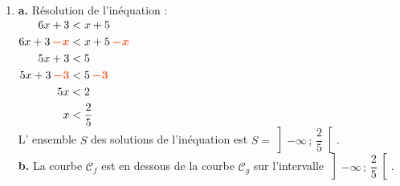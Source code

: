 \documentclass[a4paper,11pt]{article}
\begin{document}
{\begin{seanceD}{}
\begin{enumerate}
\begin{enumerate}
\begin{tikzpicture}
\end{tikzpicture}
\item On cherche les réels qui sont à la fois dans $]-\infty;22]$ et dans $]31;40]$.On regarde la partie de l'intervalle qui est coloriée à la fois en bleu et en rouge. On observe que les deux intervalles sont disjoints donc aucun réel n'appartient aux deux ensembles.\\$I={\color[HTML]{f15929}\boldsymbol{\emptyset}}$.\\
\end{enumerate}

\item  \textbf {a.}  Résolution de l'inéquation :\\
              $\begin{aligned}
              6x+3&<x+5\\
              6x+3\,{\color[HTML]{f15929}\boldsymbol{-x}}&<x+5\,{\color[HTML]{f15929}\boldsymbol{-x}}\\
              5x+3&<5\\
              5x+3\,{\color[HTML]{f15929}\boldsymbol{-3}}&<5\,{\color[HTML]{f15929}\boldsymbol{-3}}\\
              5x&<2\\
            x&<\dfrac{2}{5}
              \end{aligned}$
              \\
              L'  ensemble $S$ des solutions de l'inéquation est
              $S= \left]-\infty\,;\,\dfrac{2}{5}\right[$.\\\textbf {b.}  
              La courbe $\mathscr{C}_f$ est en dessous de la courbe $\mathscr{C}_g$ sur l'intervalle $\left]-\infty\,;\,\dfrac{2}{5}\right[$.




\end{enumerate}
\end{seanceD}}
\end{document}
